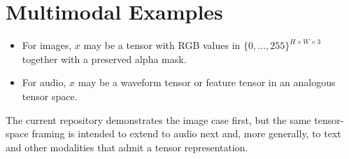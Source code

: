\documentclass[11pt]{article}
\begin{document}
\section*{Multimodal Examples}
\begin{itemize}
    \item For images, $x$ may be a tensor with RGB values in $\{0,\dots,255\}^{H \times W \times 3}$ together with a preserved alpha mask.
    \item For audio, $x$ may be a waveform tensor or feature tensor in an
    analogous tensor space.
\end{itemize}

The current repository demonstrates the image case first, but the same
tensor-space framing is intended to extend to audio next and, more generally,
to text and other modalities that admit a tensor representation.
\end{document}
